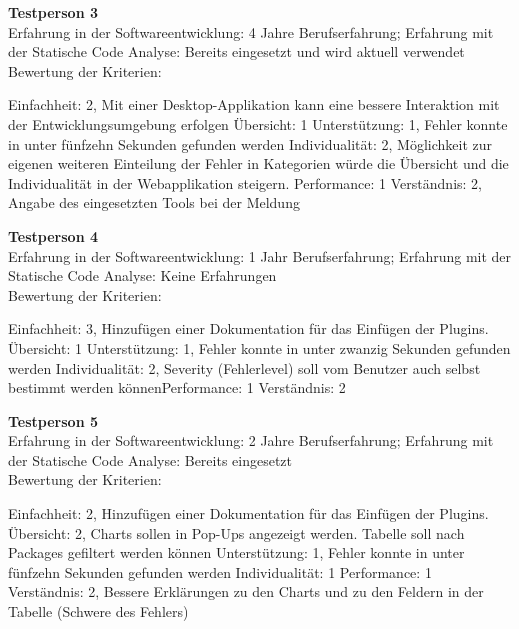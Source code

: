 \textbf{Testperson 3} \\
Erfahrung in der Softwareentwicklung: 4 Jahre Berufserfahrung; Erfahrung mit der Statische Code Analyse: Bereits eingesetzt und wird aktuell verwendet\\
Bewertung der Kriterien:

Einfachheit: 2, Mit einer Desktop-Applikation kann eine bessere Interaktion mit der Entwicklungsumgebung erfolgen \newline Übersicht: 1 \newline  Unterstützung: 1, Fehler konnte in unter fünfzehn Sekunden gefunden werden \newline Individualität: 2, Möglichkeit zur eigenen weiteren Einteilung der Fehler in Kategorien würde die Übersicht und die Individualität in der Webapplikation steigern.  \newline Performance: 1 \newline  Verständnis: 2, Angabe des eingesetzten Tools bei der Meldung\newline 

\textbf{Testperson 4} \\
Erfahrung in der Softwareentwicklung: 1 Jahr Berufserfahrung; Erfahrung mit der Statische Code Analyse: Keine Erfahrungen\\
Bewertung der Kriterien:

Einfachheit: 3, Hinzufügen einer Dokumentation für das Einfügen der Plugins.  \newline Übersicht: 1 \newline  Unterstützung: 1, Fehler konnte in unter zwanzig Sekunden gefunden werden \newline Individualität: 2, Severity (Fehlerlevel) soll vom Benutzer auch selbst bestimmt werden können\newline Performance: 1 \newline  Verständnis: 2\newline 

\textbf{Testperson 5} \\
Erfahrung in der Softwareentwicklung: 2 Jahre Berufserfahrung; Erfahrung mit der Statische Code Analyse: Bereits eingesetzt\\
Bewertung der Kriterien:

Einfachheit: 2, Hinzufügen einer Dokumentation für das Einfügen der Plugins.  \newline Übersicht: 2, Charts sollen in Pop-Ups angezeigt werden. Tabelle soll nach Packages gefiltert werden können \newline  Unterstützung: 1, Fehler konnte in unter fünfzehn Sekunden gefunden werden \newline Individualität: 1 \newline Performance: 1 \newline  Verständnis: 2, Bessere Erklärungen zu den Charts und zu den Feldern in der Tabelle (Schwere des Fehlers)\newline 

